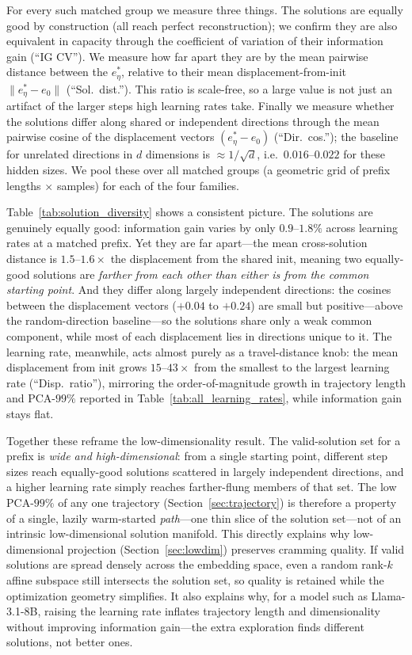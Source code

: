 For every such matched group we measure three things. The solutions are equally good by construction
(all reach perfect reconstruction); we confirm they are also equivalent in capacity through the
coefficient of variation of their information gain (``IG CV''). We measure how far apart they are by the
mean pairwise distance between the $e^*_{\eta}$, relative to their mean displacement-from-init
$\|e^*_{\eta}-e_0\|$ (``Sol.\ dist.''). This ratio is scale-free, so a large value is not just an
artifact of the larger steps high learning rates take. Finally we measure whether the solutions differ along shared or independent
directions through the mean pairwise cosine of the displacement vectors $(e^*_{\eta}-e_0)$
(``Dir.\ cos.''); the baseline for unrelated directions in $d$ dimensions is $\approx 1/\sqrt{d}$, i.e.\
$0.016$--$0.022$ for these hidden sizes. We pool these over all matched groups (a geometric grid of
prefix lengths $\times$ samples) for each of the four families.

Table~\ref{tab:solution_diversity} shows a consistent picture. The solutions are genuinely equally
good: information gain varies by only $0.9$--$1.8\%$ across learning rates at a matched prefix. Yet they
are far apart---the mean cross-solution distance is $1.5$--$1.6\times$ the displacement from the shared
init, meaning two equally-good solutions are \emph{farther from each other than either is from the
common starting point}. And they differ along largely independent directions: the cosines between the
displacement vectors ($+0.04$ to $+0.24$) are small but positive---above the random-direction
baseline---so the solutions share only a weak common component, while most of each displacement lies in
directions unique to it. The learning rate, meanwhile, acts almost purely as a travel-distance
knob: the mean displacement from init grows $15$--$43\times$ from the smallest to the largest learning
rate (``Disp.\ ratio''), mirroring the order-of-magnitude growth in trajectory length and PCA-$99\%$
reported in Table~\ref{tab:all_learning_rates}, while information gain stays flat.

Together these reframe the low-dimensionality result. The valid-solution set for a prefix is \emph{wide
and high-dimensional}: from a single starting point, different step sizes reach equally-good solutions
scattered in largely independent directions, and a higher learning rate simply reaches farther-flung
members of that set. The low PCA-$99\%$ of any one trajectory (Section~\ref{sec:trajectory}) is
therefore a property of a single, lazily warm-started \emph{path}---one thin slice of the solution
set---not of an intrinsic low-dimensional solution manifold. This directly explains why
low-dimensional projection (Section~\ref{sec:lowdim}) preserves cramming quality. If valid solutions
are spread densely across the embedding space, even a random rank-$k$ affine subspace still intersects
the solution set, so quality is retained while the optimization geometry simplifies. It also explains why, for a model such as Llama-3.1-8B, raising the learning rate inflates
trajectory length and dimensionality without improving information gain---the extra exploration finds
different solutions, not better ones.

